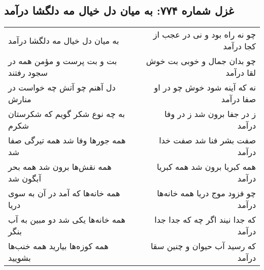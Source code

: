 \begin{center}
\section*{غزل شماره ۷۷۴: به میان دل خیال مه دلگشا درآمد}
\label{sec:0774}
\begin{longtable}{l p{0.5cm} r}
به میان دل خیال مه دلگشا درآمد
&&
چو نه راه بود و نی در عجب از کجا درآمد
\\
بت و بت پرست و مؤمن همه در سجود رفتند
&&
چو بدان جمال و خوبی بت خوش لقا درآمد
\\
دل آهنم چو آتش چه خواست در منارش
&&
نه که آینه شود خوش چو در او صفا درآمد
\\
به چه نوع شکر گویم که شکرستان شکرم
&&
ز در جفا برون شد ز در وفا درآمد
\\
همه جورها وفا شد همه تیرگی صفا شد
&&
صفت بشر فنا شد صفت خدا درآمد
\\
همه نقش‌ها برون شد همه بحر آبگون شد
&&
همه کبریا برون شد همه کبریا درآمد
\\
همه خانه‌ها که آمد در آن به سوی دریا
&&
چو فزود موج دریا همه خانه‌ها درآمد
\\
همه خانه‌ها یکی شد دو مبین به آب بنگر
&&
که جدا نیند اگر چه که جدا جدا درآمد
\\
همه کوزه‌ها بیارید همه خنب‌ها بشویید
&&
که رسید آب حیوان و چنین سقا درآمد
\\
\end{longtable}
\end{center}
